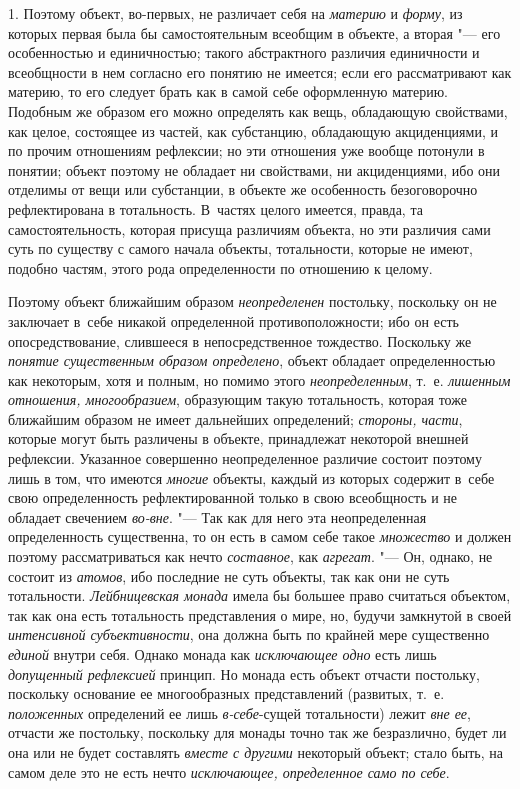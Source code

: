 1. Поэтому объект, во-первых, не различает себя на {\em материю} и
{\em форму}, из которых первая была бы самостоятельным всеобщим в объекте,
а вторая "--- его особенностью и единичностью; такого абстрактного
различия единичности и всеобщности в нем согласно его понятию не имеется;
если его рассматривают как материю, то его следует брать как в самой себе
оформленную материю. Подобным же образом его можно определять как вещь,
обладающую свойствами, как целое, состоящее из частей, как субстанцию,
обладающую акциденциями, и по прочим отношениям рефлексии; но эти отношения
уже вообще потонули в понятии; объект поэтому не обладает ни свойствами, ни
акциденциями, ибо они отделимы от вещи или субстанции, в объекте же
особенность безоговорочно рефлектирована в тотальность. В~частях целого
имеется, правда, та самостоятельность, которая присуща различиям объекта,
но эти различия сами суть по существу с самого начала объекты, тотальности,
которые не имеют, подобно частям, этого рода определенности по отношению к
целому.

Поэтому объект ближайшим образом {\em неопределенен}
постольку, поскольку он не заключает в~себе никакой
определенной противоположности; ибо он есть опосредствование, слившееся в
непосредственное тождество. Поскольку же {\em понятие существенным образом
определено}, объект обладает определенностью как некоторым,
хотя и полным, но помимо этого {\em неопределенным},
т.~е. {\em лишенным отношения, многообразием}, образующим такую тотальность,
которая тоже ближайшим образом не имеет дальнейших определений;
{\em стороны, части},
которые могут быть различены в объекте, принадлежат некоторой
внешней рефлексии. Указанное совершенно неопределенное различие состоит
поэтому лишь в том, что имеются {\em многие} объекты,
каждый из которых содержит в~себе свою определенность рефлектированной
только в свою всеобщность и не обладает свечением {\em во-вне}. "--- Так как
для него эта неопределенная определенность существенна, то он есть в самом
себе такое {\em множество} и должен поэтому рассматриваться как нечто
{\em составное}, как {\em агрегат}. "--- Он,
однако, не состоит из {\em атомов},
ибо последние не суть объекты, так как они не суть
тотальности. {\em Лейбницевская монада}
имела бы большее право считаться объектом, так как она есть
тотальность представления о мире, но, будучи замкнутой в своей
{\em интенсивной субъективности}, она должна быть по крайней мере существенно
{\em единой} внутри себя. Однако монада как {\em исключающее
одно} есть лишь {\em допущенный рефлексией}
принцип. Но монада есть объект отчасти постольку, поскольку
основание ее многообразных представлений (развитых, т.~е.
{\em положенных} определений ее лишь {\em в-себе}{}-сущей
тотальности) лежит {\em вне ее},
отчасти же постольку, поскольку для монады точно так же
безразлично, будет ли она или не будет составлять {\em вместе с другими}
некоторый объект; стало быть, на самом деле это не есть нечто
{\em исключающее, определенное само по себе}.

